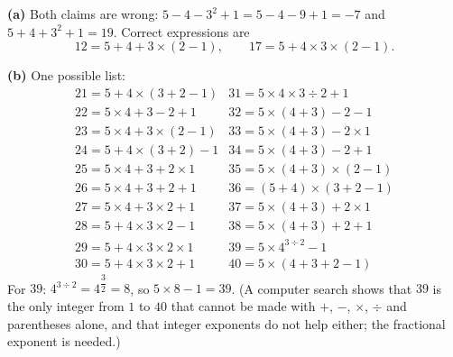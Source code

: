 \textbf{(a)} Both claims are wrong: $5-4-3^2+1=5-4-9+1=-7$ and $5+4+3^2+1=19$. Correct expressions are
\[12=5+4+3\times(2-1),\qquad 17=5+4\times3\times(2-1).\]

\textbf{(b)} One possible list:
\[\begin{array}{ll}
21=5+4\times(3+2-1) & 31=5\times4\times3\div2+1\\
22=5\times4+3-2+1 & 32=5\times(4+3)-2-1\\
23=5\times4+3\times(2-1) & 33=5\times(4+3)-2\times1\\
24=5+4\times(3+2)-1 & 34=5\times(4+3)-2+1\\
25=5\times4+3+2\times1 & 35=5\times(4+3)\times(2-1)\\
26=5\times4+3+2+1 & 36=(5+4)\times(3+2-1)\\
27=5\times4+3\times2+1 & 37=5\times(4+3)+2\times1\\
28=5+4\times3\times2-1 & 38=5\times(4+3)+2+1\\
29=5+4\times3\times2\times1 & 39=5\times4^{3\div2}-1\\
30=5+4\times3\times2+1 & 40=5\times(4+3+2-1)
\end{array}\]
For $39$: $4^{3\div2}=4^{\dfrac32}=8$, so $5\times8-1=39$. (A computer search shows that $39$ is the only integer from $1$ to $40$ that cannot be made with $+$, $-$, $\times$, $\div$ and parentheses alone, and that integer exponents do not help either; the fractional exponent is needed.)
